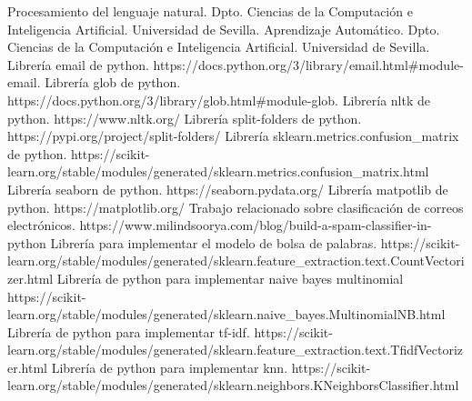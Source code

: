 \documentclass[conference,a4paper]{IEEEtran}
\begin{document}
\begin{thebibliography}{00}
 Procesamiento del lenguaje natural. Dpto. Ciencias de la Computación e Inteligencia Artificial. Universidad de Sevilla.
 Aprendizaje Automático. Dpto. Ciencias de la Computación e Inteligencia Artificial. Universidad de Sevilla.
 Librería email de python. https://docs.python.org/3/library/email.html\#module-email.
 Librería glob de python. https://docs.python.org/3/library/glob.html\#module-glob.
 Librería nltk de python. https://www.nltk.org/
 Librería split-folders de python. https://pypi.org/project/split-folders/ 
 Librería sklearn.metrics.confusion\_matrix de python. https://scikit-learn.org/stable/modules/generated/sklearn.metrics.confusion\_matrix.html
 Librería seaborn de python. https://seaborn.pydata.org/
 Librería matpotlib de python. https://matplotlib.org/
 Trabajo relacionado sobre clasificación de correos electrónicos. https://www.milindsoorya.com/blog/build-a-spam-classifier-in-python
 Librería para implementar el modelo de bolsa de palabras. https://scikit-learn.org/stable/modules/generated/sklearn.feature\_extraction.text.CountVectorizer.html
 Librería de python para implementar naive bayes multinomial https://scikit-learn.org/stable/modules/generated/sklearn.naive\_bayes.MultinomialNB.html
 Librería de python para implementar tf-idf. https://scikit-learn.org/stable/modules/generated/sklearn.feature\_extraction.text.TfidfVectorizer.html
 Librería de python para implementar knn. https://scikit-learn.org/stable/modules/generated/sklearn.neighbors.KNeighborsClassifier.html
\end{thebibliography}
\end{document}

